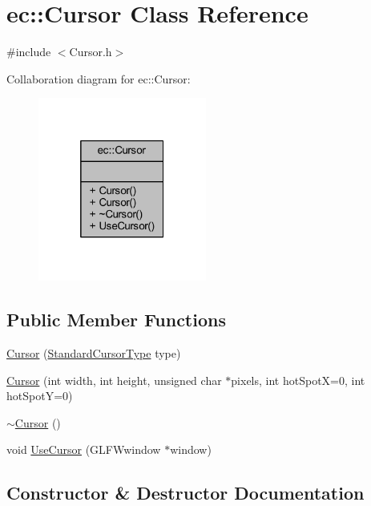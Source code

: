 \hypertarget{classec_1_1_cursor}{}\section{ec\+:\+:Cursor Class Reference}
\label{classec_1_1_cursor}


{\ttfamily \#include $<$Cursor.\+h$>$}



Collaboration diagram for ec\+:\+:Cursor\+:
\nopagebreak
\begin{figure}[H]
\begin{center}
\leavevmode
\includegraphics[width=157pt]{classec_1_1_cursor__coll__graph}
\end{center}
\end{figure}
\subsection*{Public Member Functions}
\begin{DoxyCompactItemize}
\item 
\mbox{\hyperlink{classec_1_1_cursor_a7fd103f9e129b2952484999510d8576a}{Cursor}} (\mbox{\hyperlink{namespaceec_a067d7854be2a4a8167831d52a7224e05}{Standard\+Cursor\+Type}} type)
\item 
\mbox{\hyperlink{classec_1_1_cursor_adcbabc67fe488264ee580bcae53de8df}{Cursor}} (int width, int height, unsigned char $\ast$pixels, int hot\+SpotX=0, int hot\+SpotY=0)
\item 
\mbox{\hyperlink{classec_1_1_cursor_a4617172c5106164b27ef856df0b078c3}{$\sim$\+Cursor}} ()
\item 
void \mbox{\hyperlink{classec_1_1_cursor_a9d1fe4db14b76b01715a89f91e9c2216}{Use\+Cursor}} (G\+L\+F\+Wwindow $\ast$window)
\end{DoxyCompactItemize}


\subsection{Constructor \& Destructor Documentation}
\mbox{\label{classec_1_1_cursor_a7fd103f9e129b2952484999510d8576a}} 
